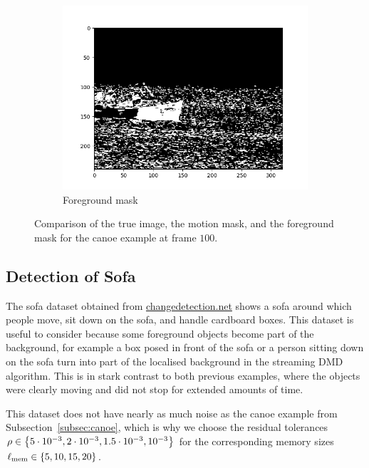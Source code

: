 \begin{figure}[!ht]
\begin{subfigure}{.3\textwidth}
        \includegraphics[width=\textwidth]{canoe_fg_frame_100.png}
        \caption{Foreground mask}
    \end{subfigure}
    \caption{Comparison of the true image, the motion mask, and the foreground mask for the canoe example at frame $100$.}\label{fig:canoe-frame-100}
\end{figure}

\subsection{Detection of Sofa}\label{subsec:sofa} %

The sofa dataset obtained from \href{changedetection.net}{changedetection.net} shows a sofa around which people move, sit down on the sofa, and handle cardboard boxes. This dataset is useful to consider because some foreground objects become part of the background, for example a box posed in front of the sofa or a person sitting down on the sofa turn into part of the localised background in the streaming DMD algorithm. This is in stark contrast to both previous examples, where the objects were clearly moving and did not stop for extended amounts of time.

This dataset does not have nearly as much noise as the canoe example from Subsection~\ref{subsec:canoe}, which is why we choose the residual tolerances $\rho \in \left\{5 \cdot 10^{-3}, 2 \cdot 10^{-3}, 1.5 \cdot 10^{-3}, 10^{-3}\right\}$ for the corresponding memory sizes $\ell_\text{mem} \in \left\{5, 10, 15, 20\right\}$.

